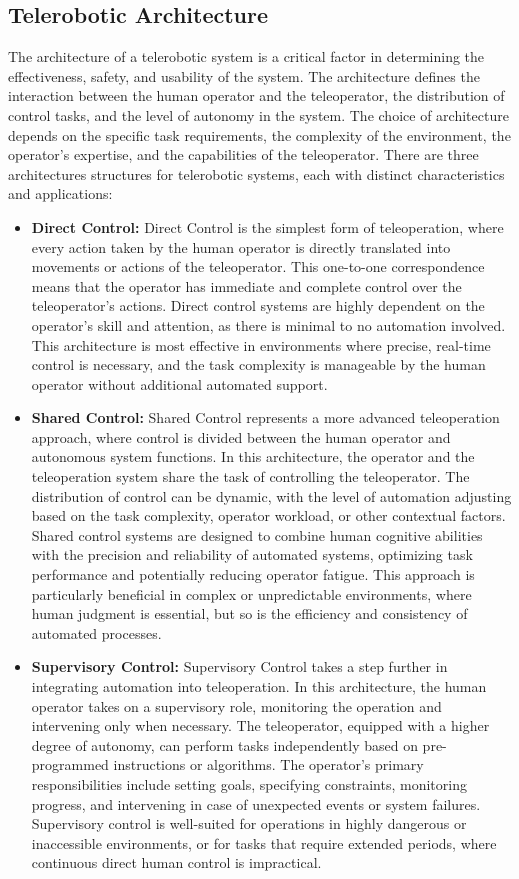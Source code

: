\subsection{Telerobotic Architecture}
The architecture of a telerobotic system is a critical factor in determining the effectiveness, safety, and usability of the system. The architecture defines the interaction between the human operator and the teleoperator, the distribution of control tasks, and the level of autonomy in the system. The choice of architecture depends on the specific task requirements, the complexity of the environment, the operator's expertise, and the capabilities of the teleoperator.
There are three architectures structures for telerobotic systems, each with distinct characteristics and applications:
\begin{itemize}
    \item\textbf{Direct Control:} Direct Control is the simplest form of teleoperation, where every action taken by the human operator is directly translated into movements or actions of the teleoperator. This one-to-one correspondence means that the operator has immediate and complete control over the teleoperator's actions. Direct control systems are highly dependent on the operator's skill and attention, as there is minimal to no automation involved. This architecture is most effective in environments where precise, real-time control is necessary, and the task complexity is manageable by the human operator without additional automated support.

    \item\textbf{Shared Control:} Shared Control represents a more advanced teleoperation approach, where control is divided between the human operator and autonomous system functions. In this architecture, the operator and the teleoperation system share the task of controlling the teleoperator. The distribution of control can be dynamic, with the level of automation adjusting based on the task complexity, operator workload, or other contextual factors. Shared control systems are designed to combine human cognitive abilities with the precision and reliability of automated systems, optimizing task performance and potentially reducing operator fatigue. This approach is particularly beneficial in complex or unpredictable environments, where human judgment is essential, but so is the efficiency and consistency of automated processes.

    \item\textbf{Supervisory Control:} Supervisory Control takes a step further in integrating automation into teleoperation. In this architecture, the human operator takes on a supervisory role, monitoring the operation and intervening only when necessary. The teleoperator, equipped with a higher degree of autonomy, can perform tasks independently based on pre-programmed instructions or algorithms. The operator's primary responsibilities include setting goals, specifying constraints, monitoring progress, and intervening in case of unexpected events or system failures. Supervisory control is well-suited for operations in highly dangerous or inaccessible environments, or for tasks that require extended periods, where continuous direct human control is impractical.


\end{itemize}
